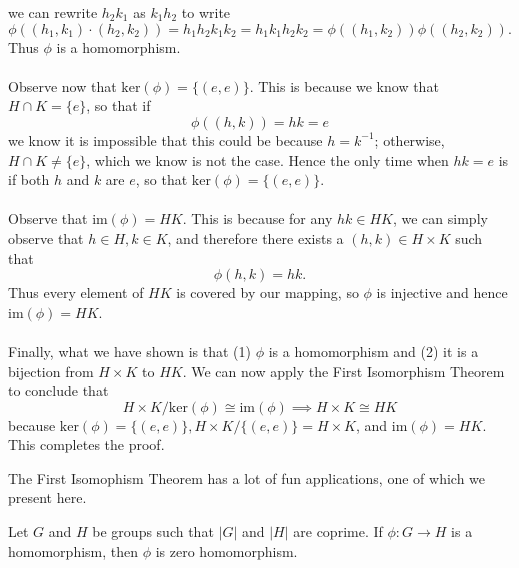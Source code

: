 \begin{prf}
\begin{itemize}
            we can rewrite $h_2k_1$ as $k_1h_2$ to write 
            $$
            \phi((h_1, k_1)\cdot(h_2, k_2)) =  h_1h_2k_1k_2
            = h_1k_1h_2k_2 = \phi((h_1, k_2))\phi((h_2, k_2)).
            $$
            Thus $\phi$ is a homomorphism. \\
            \\
            Observe now that $\text{ker}(\phi) = \{(e, e)\}$. This is because we 
            know that $H \cap K = \{e\}$, so that if 
            $$
            \phi((h, k)) = hk = e
            $$
            we know it is impossible that this could be because $h = k^{-1}$; otherwise, 
            $H \cap K \ne \{e\}$, which we know is not the case. 
            Hence the only time when $hk = e$ is if both $h$ and $k$ 
            are $e$, so that $\text{ker}(\phi) = \{(e, e)\}$.
            \\
            \\
            Observe that $\text{im}(\phi) = HK$. This is because for any $hk \in 
            HK$, we can simply observe that $h \in H, k \in K$, and therefore there 
            exists a $(h, k) \in H \times K$ such that 
            $$
            \phi(h, k) = hk.
            $$
            Thus every element of $HK$ is covered by our mapping, so $\phi$ is injective 
            and hence $\text{im}(\phi) = HK$.
            \\
            \\
            Finally, what we have shown is that (1) $\phi$ is a homomorphism and 
            (2) it is a bijection from $H \times K$ to $HK$. We can now apply the 
            First Isomorphism Theorem to conclude that 
            $$ 
            H \times K/\text{ker}(\phi) \cong \text{im}(\phi) \implies H\times K \cong HK
            $$
            because $\text{ker}(\phi) = \{(e, e)\}, H \times K/\{(e, e)\} = H \times K$, 
            and $\text{im}(\phi) = HK$. This completes the proof.
        \end{itemize}
    \end{prf}

    The First Isomophism Theorem has a lot of fun applications, one of
    which we present here. 

    \begin{thm}
        Let $G$ and $H$ be groups such that $|G|$ and $|H|$ are
        coprime. If $\phi: G \to H$ is a homomorphism, then $\phi$ is
        zero homomorphism. 
    \end{thm}

